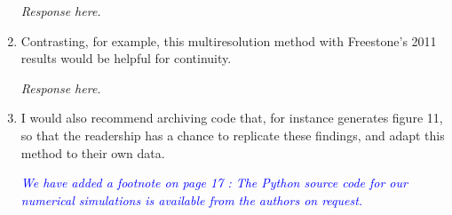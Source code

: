\documentclass{article}
\newcommand{\parham}[1]{\textcolor{blue}{#1}}
\begin{document}
\begin{enumerate}
			\emph{Response here.}
			
			\item Contrasting, for example, this multiresolution method with Freestone's 2011 results would be helpful for continuity.
			
			\emph{Response here.}
			
			\item I would also recommend archiving code that, for instance generates figure 11, so that the readership has a chance to replicate these findings, and adapt this method to their own data.
			
 			\emph{\parham{We have added a footnote on page 17 : The Python source code for our numerical simulations is available from the authors on request.}}
 		
			                                       
			\end{enumerate}  
\end{document}
